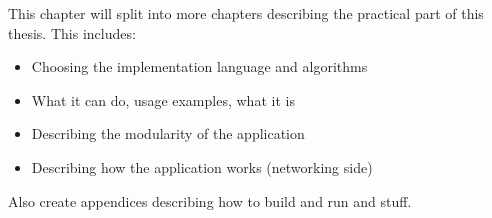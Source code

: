 
This chapter will split into more chapters describing the practical part of this thesis. This includes:

\begin{itemize}
  \item Choosing the implementation language and algorithms
  \item What it can do, usage examples, what it is
  \item Describing the modularity of the application
  \item Describing how the application works (networking side)
\end{itemize}


\noindent Also create appendices describing how to build and run and stuff.